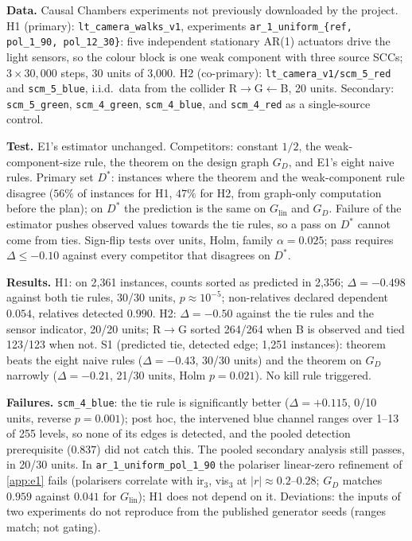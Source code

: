 \textbf{Data.} Causal Chambers experiments not previously downloaded by the
project. H1 (primary): \texttt{lt\_camera\_walks\_v1}, experiments
\texttt{ar\_1\_uniform\_\{ref, pol\_1\_90, pol\_12\_30\}}: five independent
stationary AR(1) actuators drive the light sensors, so the colour block is
one weak component with three source SCCs; $3\times30{,}000$ steps, 30 units of
3{,}000. H2 (co-primary): \texttt{lt\_camera\_v1/scm\_5\_red} and
\texttt{scm\_5\_blue}, i.i.d.\ data from the collider R$\to$G$\leftarrow$B, 20
units. Secondary: \texttt{scm\_5\_green}, \texttt{scm\_4\_green},
\texttt{scm\_4\_blue}, and \texttt{scm\_4\_red} as a single-source control.

\textbf{Test.} E1's estimator unchanged. Competitors: constant $1/2$, the
weak-component-size rule, the theorem on the design graph $G_D$, and E1's
eight naive rules. Primary set $D^*$: instances where the theorem and the
weak-component rule disagree ($56\%$ of instances for H1, $47\%$ for H2, from
graph-only computation before the plan); on $D^*$ the prediction is the same
on $G_{\mathrm{lin}}$ and $G_D$. Failure of the estimator pushes observed values
towards the tie rules, so a pass on $D^*$ cannot come from ties. Sign-flip
tests over units, Holm, family $\alpha=0.025$; pass requires $\Delta\le-0.10$
against every competitor that disagrees on $D^*$.

\textbf{Results.} H1: on 2{,}361 instances, counts sorted as predicted in
2{,}356; $\Delta=-0.498$ against both tie rules, 30/30 units, $p\approx10^{-5}$;
non-relatives declared dependent $0.054$, relatives detected $0.990$. H2:
$\Delta=-0.50$ against the tie rules and the sensor indicator, 20/20 units;
R$\to$G sorted 264/264 when B is observed and tied 123/123 when not. S1
(predicted tie, detected edge; 1{,}251 instances): theorem beats the eight
naive rules ($\Delta=-0.43$, 30/30 units) and the theorem on $G_D$ narrowly
($\Delta=-0.21$, 21/30 units, Holm $p=0.021$). No kill rule triggered.

\textbf{Failures.} \texttt{scm\_4\_blue}: the tie rule is significantly better
($\Delta=+0.115$, 0/10 units, reverse $p=0.001$); post hoc, the intervened blue
channel ranges over 1--13 of 255 levels, so none of its edges is detected, and
the pooled detection prerequisite ($0.837$) did not catch this. The pooled
secondary analysis still passes, in 20/30 units. In
\texttt{ar\_1\_uniform\_pol\_1\_90} the polariser linear-zero refinement of
\cref{app:e1} fails (polarisers correlate with ir$_3$, vis$_3$ at
$|r|\approx0.2$--$0.28$; $G_D$ matches $0.959$ against $0.041$ for
$G_{\mathrm{lin}}$); H1 does not depend on it. Deviations: the inputs of two
experiments do not reproduce from the published generator seeds (ranges
match; not gating).
